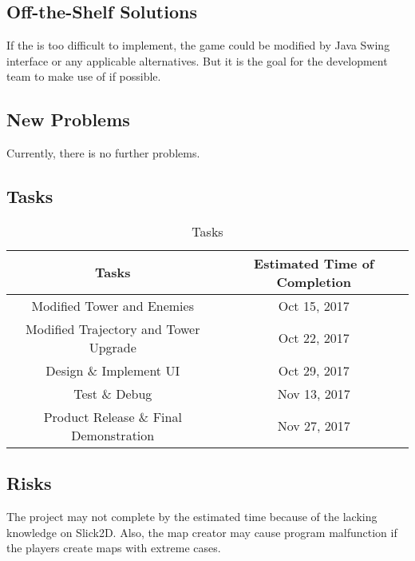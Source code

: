 \documentclass[12pt]{article}
\begin{document}
\subsection{Off-the-Shelf Solutions}
If the \color{red}{Slick2D} is too difficult to implement, the game could be modified by Java Swing interface or any applicable alternatives. But it is the goal for the development team to make use of \color{red}{Slick2D} if possible.\color{black}

\subsection{New Problems}
\color{black}Currently, there is no further problems.

\subsection{Tasks}
\begin{center}
\begin{table}[!hpb]
    \begin{tabular}{|c|c|}
	\hline
	Tasks & Estimated Time of Completion \\ \hline
	Modified Tower and Enemies  & Oct 15, 2017 \\ \hline
	Modified Trajectory and Tower Upgrade & Oct 22, 2017 \\ \hline
	Design \& Implement UI & Oct 29, 2017 \\ \hline
	Test \& Debug & Nov 13, 2017 \\ \hline
	Product Release \& Final Demonstration & Nov 27, 2017 \\ \hline
    \end{tabular}
    \caption{Tasks} 
\end{table}
\end{center}



\subsection{Risks}
The project may not complete by the estimated time because of the lacking knowledge on Slick2D. Also, the map creator may cause program malfunction if the players create maps with extreme cases.
\end{document}
